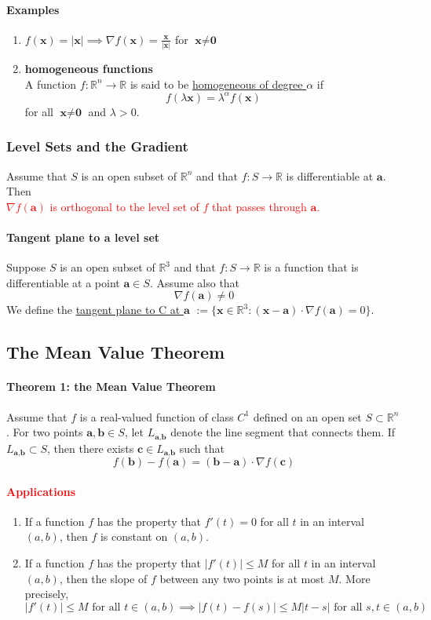 \documentclass[11pt]{article}
\newcommand{\tb}[1]{\textbf{#1}}
\newcommand{\real}[0]{\mathbb{R}}
\newcommand{\under}[1]{\underline{#1}}
\newcommand{\vx}[0]{\tb{x}}
\newcommand{\vo}[0]{\tb{0}}
\newcommand{\va}[0]{\tb{a}}
\newcommand{\vb}[0]{\tb{b}}
\newcommand{\vc}[0]{\tb{c}}
\begin{document}
\paragraph{Examples}
\begin{enumerate}
	\item $f(\vx) = |\vx| \implies \nabla f(\vx) = \frac{\vx}{|\vx|}$ for $\vx \neq \vo$
	\item \tb{homogeneous functions}\\
	A function $f: \real^n \rightarrow \real$ is said to be \under{homogeneous of degree $\alpha$} if $$f(\lambda\vx) = \lambda^\alpha f(\vx)$$
	for all $\vx \neq \vo$ and $\lambda > 0$.
\end{enumerate}
\subsubsection{Level Sets and the Gradient}
Assume that $S$ is an open subset of $\real^n$ and that $f: S \rightarrow \real$ is differentiable at $\va$. Then \\
\textcolor{red}{$\nabla f(\va)$ is orthogonal to the level set of $f$ that passes through $\va$.}
\paragraph{Tangent plane to a level set}
Suppose $S$ is an open subset of $\real^3$ and that $f: S \rightarrow \real$ is a function that is differentiable at a point $\va \in S$. Assume also that
$$\nabla f(\va) \neq 0$$
We define the \under{tangent plane to C at $\va$} $:= \{\vx \in \real^3: (\vx - \va)\cdot \nabla f(\va) = 0\}$.
\subsection{The Mean Value Theorem}
\paragraph{Theorem 1: the Mean Value Theorem} Assume that $f$ is a real-valued function of class $C^1$ defined on an open set $S \subset \real^n$. For two points $\va, \vb \in S$, let $L_{\va, \vb}$ denote the line segment that connects them. If $L_{\va, \vb} \subset S$, then there exists $\vc \in L_{\va, \vb}$ such that $$f(\vb) - f(\va) = (\vb - \va)\cdot \nabla f(\vc)$$
\paragraph{\textcolor{red}{Applications}}
\begin{enumerate}
	\item If a function $f$ has the property that $f'(t) = 0$ for all $t$ in an interval $(a,b)$, then $f$ is constant on $(a,b)$.
	\item If a function $f$ has the property that $|f'(t)| \leq M$ for all $t$ in an interval $(a,b)$, then the slope of $f$ between any two points is at most $M$. More precisely,
	$$|f'(t)| \leq M \mbox{ for all }t \in (a,b) \implies |f(t) - f(s)| \leq M|t-s| \mbox { for all }s, t \in (a,b)$$
\end{enumerate}
\end{document}
